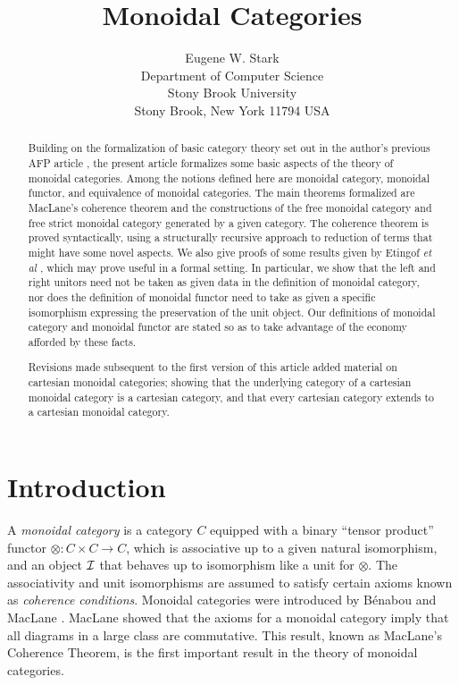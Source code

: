 \documentclass[11pt,notitlepage,a4paper]{report}
\begin{document}
\title{Monoidal Categories}
\author{Eugene W. Stark\\[\medskipamount]
        Department of Computer Science\\
        Stony Brook University\\
        Stony Brook, New York 11794 USA}
\maketitle

\begin{abstract}
Building on the formalization of basic category theory set out in the author's
previous AFP article \cite{Category3-AFP}, the present article formalizes
some basic aspects of the theory of monoidal categories.
Among the notions defined here are monoidal category, monoidal functor,
and equivalence of monoidal categories.
The main theorems formalized are MacLane's coherence theorem and the
constructions of the free monoidal category and free strict monoidal category
generated by a given category.
The coherence theorem is proved syntactically, using a structurally recursive
approach to reduction of terms that might have some novel aspects.
We also give proofs of some results given by Etingof {\em et al}
\cite{Etingof15}, which may prove useful in a formal setting.
In particular, we show that the left and right unitors need not be taken as
given data in the definition of monoidal category, nor does the definition of
monoidal functor need to take as given a specific isomorphism expressing the
preservation of the unit object.
Our definitions of monoidal category and monoidal functor are stated so as
to take advantage of the economy afforded by these facts.

Revisions made subsequent to the first version of this article added material on
cartesian monoidal categories; showing that the underlying category of a cartesian
monoidal category is a cartesian category, and that every cartesian category
extends to a cartesian monoidal category.
\end{abstract}

\tableofcontents

\chapter{Introduction}

A {\em monoidal category} is a category $C$ equipped with a
binary ``tensor product'' functor $\otimes: C \times C \rightarrow C$,
which is associative up to a given natural isomorphism,
and an object ${\cal I}$ that behaves up to isomorphism like
a unit for $\otimes$.  The associativity and unit isomorphisms are
assumed to satisfy certain axioms known as {\em coherence conditions}.
Monoidal categories were introduced by B\'{e}nabou \cite{Benabou63} and
MacLane \cite{MacLane63}.  MacLane showed that the axioms for a monoidal
category imply that all diagrams in a large class are commutative.
This result, known as MacLane's Coherence Theorem, is the first important
result in the theory of monoidal categories.
\end{document}
